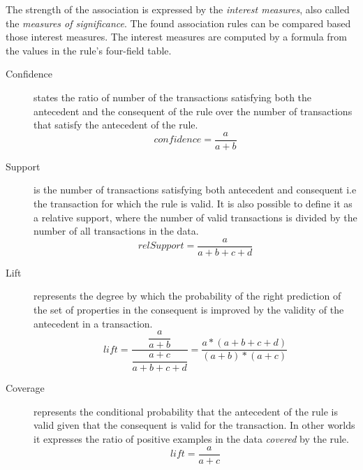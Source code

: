 The strength of the association is expressed by the \textit{interest measures}, also called the \textit{measures of significance}. The found association rules can be compared based those interest measures. The interest measures are computed by a formula from the values in the rule's four-field table.

\begin{description}
\item [Confidence] states the ratio of number of the transactions satisfying both the antecedent and the consequent of the rule over the number of transactions that satisfy the antecedent of the rule.
$$
    confidence = \dfrac{a}{a + b}
$$
\item [Support] is the number of transactions satisfying both antecedent and consequent i.e the transaction for which the rule is valid. It is also possible to define it as a relative support, where the number of valid transactions is divided by the number of all transactions in the data.
$$
    relSupport = \dfrac{a}{a + b + c + d}
$$
\item [Lift] represents the degree by which the probability of the right prediction of the set of properties in the consequent is improved by the validity of the antecedent in a transaction.
$$
    lift = \dfrac{\dfrac{a}{a + b}}{\dfrac{a + c}{a + b + c + d}} = \frac{a * (a + b + c + d)}{(a + b) * (a + c)}
$$

\item [Coverage] represents the conditional probability that the antecedent of the rule is valid given that the consequent is valid for the transaction. In other worlds it expresses the ratio of positive examples in the data \textit{covered} by the rule.
$$
    lift = \dfrac{a}{a + c}
$$
\end{description}




